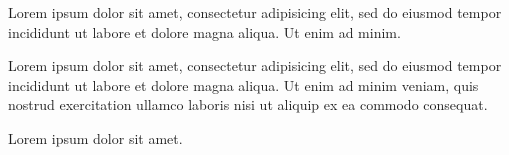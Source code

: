 \documentclass{article}
\begin{document}
Lorem ipsum dolor sit amet, consectetur adipisicing elit, sed do eiusmod
tempor incididunt ut labore et dolore magna aliqua. Ut enim ad minim.

\begin{clozepar}
Lorem ipsum dolor sit amet, consectetur adipisicing elit, sed do eiusmod
tempor incididunt ut labore et dolore magna aliqua. Ut enim ad minim
veniam, quis nostrud exercitation ullamco laboris nisi ut aliquip ex ea
commodo consequat.
\end{clozepar}

Lorem ipsum dolor sit amet.
\end{document}
